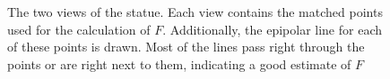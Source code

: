 \documentclass[11pt,a4paper]{article}
\begin{document}
\begin{figure}

\caption{The two views of the statue. Each view contains the matched points used for the calculation of $F$. Additionally, the epipolar line for each of these points is drawn. Most of the lines pass right through the points or are right next to them, indicating a good estimate of $F$}%
\label{fig:4}
\end{figure}

\FloatBarrier
\end{document}
